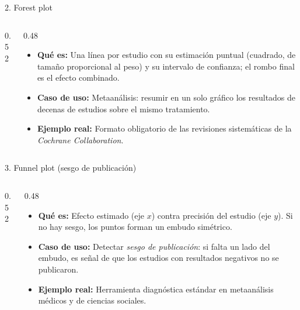 \documentclass[aspectratio=169,9pt]{beamer}
\newcommand{\ficha}[3]{%
\begin{itemize}
\item \textbf{Qué es:} #1
\item \textbf{Caso de uso:} #2
\item \textbf{Ejemplo real:} #3
\end{itemize}}
\begin{document}
\begin{frame}{2. Forest plot}
\begin{columns}[T]
\begin{column}{0.52\textwidth}
\centering
{}
\end{column}
\begin{column}{0.48\textwidth}
\ficha{Una línea por estudio con su estimación puntual (cuadrado, de tamaño proporcional al peso) y su intervalo de confianza; el rombo final es el efecto combinado.}
{Metaanálisis: resumir en un solo gráfico los resultados de decenas de estudios sobre el mismo tratamiento.}
{Formato obligatorio de las revisiones sistemáticas de la \emph{Cochrane Collaboration}.}
\end{column}
\end{columns}
\end{frame}

\begin{frame}{3. Funnel plot (sesgo de publicación)}
\begin{columns}[T]
\begin{column}{0.52\textwidth}
\centering
{}
\end{column}
\begin{column}{0.48\textwidth}
\ficha{Efecto estimado (eje $x$) contra precisión del estudio (eje $y$). Si no hay sesgo, los puntos forman un embudo simétrico.}
{Detectar \emph{sesgo de publicación}: si falta un lado del embudo, es señal de que los estudios con resultados negativos no se publicaron.}
{Herramienta diagnóstica estándar en metaanálisis médicos y de ciencias sociales.}
\end{column}
\end{columns}
\end{frame}
\end{document}
